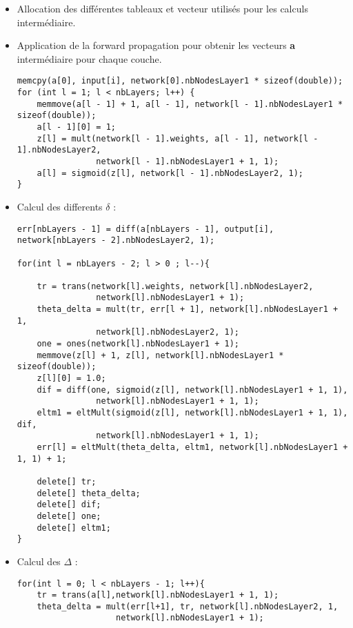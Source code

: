 \begin{itemize}
\item Allocation des différentes tableaux et vecteur utilisés pour les calculs intermédiaire.
\item Application de la forward propagation pour obtenir les vecteurs \textbf{a} intermédiaire pour chaque couche.
\begin{verbatim}
memcpy(a[0], input[i], network[0].nbNodesLayer1 * sizeof(double));
for (int l = 1; l < nbLayers; l++) {
	memmove(a[l - 1] + 1, a[l - 1], network[l - 1].nbNodesLayer1 * sizeof(double));
	a[l - 1][0] = 1;
	z[l] = mult(network[l - 1].weights, a[l - 1], network[l - 1].nbNodesLayer2,
	 			network[l - 1].nbNodesLayer1 + 1, 1);
	a[l] = sigmoid(z[l], network[l - 1].nbNodesLayer2, 1);
}
\end{verbatim}
\item Calcul des differents $\delta$ :
\begin{verbatim}
err[nbLayers - 1] = diff(a[nbLayers - 1], output[i], network[nbLayers - 2].nbNodesLayer2, 1);

for(int l = nbLayers - 2; l > 0 ; l--){

	tr = trans(network[l].weights, network[l].nbNodesLayer2,
				network[l].nbNodesLayer1 + 1);
	theta_delta = mult(tr, err[l + 1], network[l].nbNodesLayer1 + 1,
				network[l].nbNodesLayer2, 1);
	one = ones(network[l].nbNodesLayer1 + 1);
	memmove(z[l] + 1, z[l], network[l].nbNodesLayer1 * sizeof(double));
	z[l][0] = 1.0;
	dif = diff(one, sigmoid(z[l], network[l].nbNodesLayer1 + 1, 1),
				network[l].nbNodesLayer1 + 1, 1);
	eltm1 = eltMult(sigmoid(z[l], network[l].nbNodesLayer1 + 1, 1), dif,
				network[l].nbNodesLayer1 + 1, 1);
	err[l] = eltMult(theta_delta, eltm1, network[l].nbNodesLayer1 + 1, 1) + 1;

	delete[] tr;
	delete[] theta_delta;
	delete[] dif;
	delete[] one;
	delete[] eltm1;
}
\end{verbatim}
\item Calcul des $\Delta$ :

\begin{verbatim}
for(int l = 0; l < nbLayers - 1; l++){
	tr = trans(a[l],network[l].nbNodesLayer1 + 1, 1);
	theta_delta = mult(err[l+1], tr, network[l].nbNodesLayer2, 1,
					network[l].nbNodesLayer1 + 1);


\end{verbatim}
\end{itemize}
